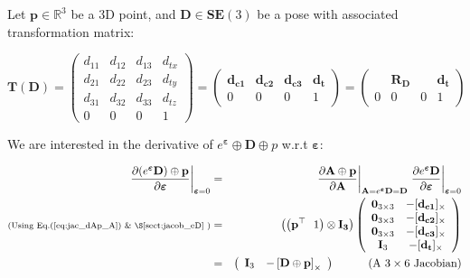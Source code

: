 \documentclass[a4paper,11pt]{report}
\newcommand{\E}{{\bm{\varepsilon}}}
\begin{document}
Let $\mathbf{p} \in \mathbb{R}^3$ be a 3D point, and 
$\mathbf{D} \in \mathbf{SE}(3)$ be a pose with associated transformation matrix:

\begin{equation}
\mathbf{T}(\mathbf{D}) = 
\left(
\begin{array}{ccc|c}
 d_{11} & d_{12} & d_{13} & d_{tx}   \\
 d_{21} & d_{22} & d_{23} & d_{ty}   \\
 d_{31} & d_{32} & d_{33} & d_{tz}   \\
\hline
  0 & 0 & 0 & 1
\end{array}
\right) 
=
\left(
\begin{array}{ccc|c}
 \mathbf{d_{c1}}  & \mathbf{d_{c2}}  & \mathbf{d_{c3}}  & \mathbf{d_{t}}  \\
\hline
  0 & 0 & 0 & 1
\end{array}
\right)
= 
\left(
\begin{array}{ccc|c}
   & \mathbf{R_D}  &  & \mathbf{d_{t}}  \\
\hline
  0 & 0 & 0 & 1
\end{array}
\right)
\end{equation}

We are interested in the derivative of $e^\E \oplus \mathbf{D} \oplus p$ w.r.t $\E$:

\begin{eqnarray}
\left. \frac{\partial (e^\E \mathbf{D}) \oplus \mathbf{p} }{\partial \E} \right|_{\E = 0}
&=& 
\left. \frac{\partial \mathbf{A} \oplus \mathbf{p}}{\partial \mathbf{A} } \right|_{\mathbf{A}=e^\E \mathbf{D} = \mathbf{D}}
\left. \frac{\partial e^\E \mathbf{D}}{\partial \E} \right|_{\E=0}
\\
\text{\scriptsize{(Using Eq.(\ref{eq:jac_dAp_A}) \& \S\ref{sect:jacob_eD}} )} &=&
\left(\left( \mathbf{p}^\top ~~ 1 \right) \otimes \mathbf{I_3} \right)
\left(
\begin{array}{cc}
 \mathbf{0}_{3\times 3}  & -[\mathbf{d_{c1}}]_\times \\
 \mathbf{0}_{3\times 3}  & -[\mathbf{d_{c2}}]_\times \\
 \mathbf{0}_{3\times 3}  & -[\mathbf{d_{c3}}]_\times \\
 \mathbf{I}_{3}  & -[\mathbf{d_{t}}]_\times \\
\end{array}
\right)
\\
&=& 
\left(
\begin{array}{cc}
 \mathbf{I}_3   & - \left[ \mathbf{D} \oplus \mathbf{p} \right]_\times
\end{array}
\right)
\quad\quad\quad \text{(A $3 \times 6$ Jacobian)}
\end{eqnarray}
\end{document}
